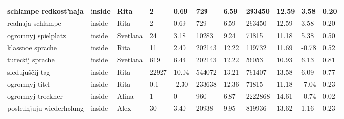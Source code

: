 \begin{longtable}{|p{3cm}|p{1cm}|p{1cm}|R{0.8cm}|R{0.8cm}|R{1.2cm}|R{1cm}|R{1.3cm}|R{1cm}|R{0.8cm}|R{0.6cm}|}
schlampe redkost'naja                                              & inside      & Rita      & 2                   & 0.69                      & 729        & 6.59             & 293450       & 12.59                 & 3.58  & 0.20                 \\ \hline
realnaja schlampe                                                  & inside      & Rita      & 2                   & 0.69                      & 729        & 6.59             & 293450       & 12.59                 & 3.58  & 0.20                 \\ \hline
ogromnyj spielplatz                                                & inside      & Svetlana  & 24                  & 3.18                      & 10283      & 9.24             & 71815        & 11.18                 & 5.38  & 0.50                 \\ \hline
klassnoe sprache                                                   & inside      & Rita      & 11                  & 2.40                      & 202143     & 12.22            & 119732       & 11.69                 & -0.78 & 0.52                 \\ \hline
tureckij sprache                                                   & inside      & Svetlana  & 619                 & 6.43                      & 202143     & 12.22            & 56053        & 10.93                 & 6.13  & 0.81                 \\ \hline
sleduju\v{s}\v{c}ij tag                                            & inside      & Rita      & 22927               & 10.04                     & 544072     & 13.21            & 791407       & 13.58                 & 6.09  & 0.77                 \\ \hline
ogromnyj titel                                                     & inside      & Rita      & 0.1                 & -2.30                     & 233638     & 12.36            & 71815        & 11.18                 & -7.04 & 0.23                 \\ \hline
ogromnyj trockner                                                  & inside      & Alina     & 1                   & 0                      & 960        & 6.87             & 2222868      & 14.61                 & -0.74 & 0.02                 \\ \hline
poslednjuju wiederholung                                           & inside      & Alex      & 30                  & 3.40                      & 20938      & 9.95             & 819936       & 13.62                 & 1.16  & 0.23                 \\ \hline

\end{longtable}

\normalsize %